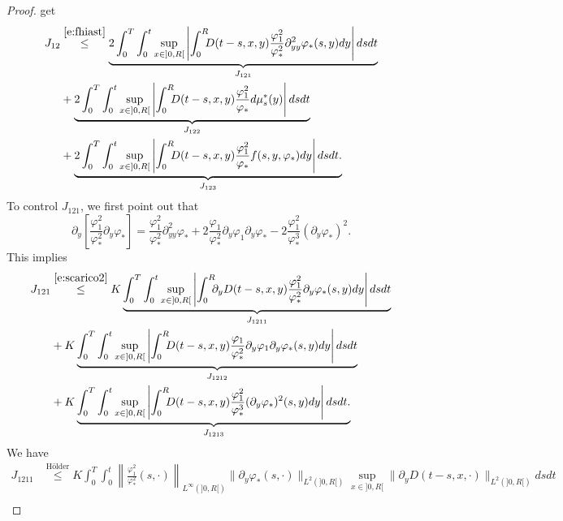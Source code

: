 \documentclass[11pt,leqno]{amsart}
\numberwithin{equation}{section}
\begin{document}
\begin{proof}
get 
\begin{equation}
\label{e:geiunodue}
\begin{split}
   J_{12} & \stackrel{\eqref{e:fhiast}}{\leq}
     \underbrace{2 \int_0^T 
  \int_0^t  \sup_{x \in ]0, R[} \left|  \int_0^R \! \! \! D(t-s, x, y) \frac{{\varphi}_1^2}{{\varphi}_\ast^2} 
  \partial^2_{yy}
   {\varphi}_\ast (s, y) dy
  \right| ds 
   dt}_{J_{121}} \\ & +
    \underbrace{2 \int_0^T
  \int_0^t  \sup_{x \in ]0, R[} \left|  \int_0^R \! \! \! D(t-s, x, y) \frac{{\varphi}_1^2}{{\varphi}_\ast} 
  d \mu^\ast_s (y)  
  \right|  ds 
  dt}_{J_{122}} \\ & + 
   \underbrace{2 \int_0^T
  \int_0^t   \sup_{x \in ]0, R[} \left|  \int_0^R \! \! \! D(t-s, x, y) \frac{{\varphi}_1^2}{{\varphi}_\ast} 
  f(s, y, {\varphi}_\ast) dy  
  \right|  ds 
  dt. }_{J_{123}}
\end{split}
\end{equation}
To control $J_{121}$, we first point out that 
\begin{equation}
\label{e:scarico2}
    \partial_y \left[ \frac{{\varphi}_1^2}{{\varphi}_\ast^2} 
  \partial_y
   {\varphi}_\ast \right] =
  \frac{{\varphi}_1^2}{{\varphi}_\ast^2}  \partial^2_{yy} {\varphi}_\ast +
  2 \frac{{\varphi}_1}{{\varphi}_\ast^2}  \partial_y {\varphi}_1 \partial_y {\varphi}_\ast 
  - 2 \frac{{\varphi}_1^2}{{\varphi}_\ast^3} (\partial_y {\varphi}_\ast )^2.  
\end{equation}
This implies 
\begin{equation}
\label{e:geiunodueuno}
\begin{split}
    J_{121} & \stackrel{\eqref{e:scarico2}}{\leq}
   K \underbrace{\int_0^T 
  \int_0^t \sup_{x \in ]0, R[} \left|\int_0^R \! \! \! 
  \partial_y D(t-s, x, y) \frac{{\varphi}_1^2}{{\varphi}_\ast^2} 
  \partial_y
   {\varphi}_\ast (s, y) dy
  \right|   ds 
  dt}_{J_{1211}} \\ & + K
  \underbrace{\int_0^T
  \int_0^t  \sup_{x \in ]0, R[} \left| \int_0^R \! \! \! 
   D(t-s, x, y)  \frac{{\varphi}_1}{{\varphi}_\ast^2}  \partial_y {\varphi}_1 \partial_y {\varphi}_\ast 
   (s, y) dy
  \right|  ds 
   dt}_{J_{1212}} \\ & +
  K  \underbrace{\int_0^T 
  \int_0^t  \sup_{x \in ]0, R[} \left| \int_0^R \! \! \! 
   D(t-s, x, y)  \frac{{\varphi}_1^2}{{\varphi}_\ast^3} (\partial_y {\varphi}_\ast )^2 
   (s, y) dy
   \right|  ds 
  dt.}_{J_{1213}} \\
\end{split} 
\end{equation}
We have 
\begin{equation}
  \label{e:geiunodueunouno}
  \begin{split}
    J_{1211} & \stackrel{\text{H\"older}}{\leq} K \int_0^T \!\!\int_0^t
    \left\| \frac{{\varphi}_1^2}{{\varphi}_\ast^2} (s, \cdot)
    \right\|_{L^\infty(]0, R[)} \| \partial_y {\varphi}_\ast (s, \cdot)
    \|_{L^2 (]0, R[)} \sup_{x \in ]0, R[} \|
    \partial_y D(t-s, x, \cdot)\|_{L^2 (]0, R[ )} ds
    dt 
    \\
    

\end{split}
\end{equation}
\end{proof}
\end{document}
